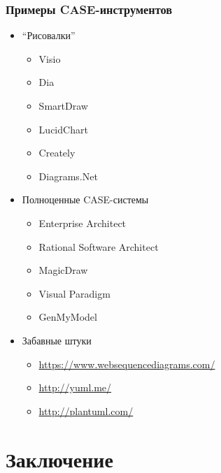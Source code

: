 \documentclass[xetex,mathserif,serif]{beamer}
\begin{document}
    \begin{frame}
        \frametitle{Примеры CASE-инструментов}
        \begin{itemize}
            \item ``Рисовалки''
            \begin{itemize}
                \item Visio
                \item Dia
                \item SmartDraw
                \item LucidChart
                \item Creately
                \item Diagrams.Net
            \end{itemize}
            \item Полноценные CASE-системы
            \begin{itemize}
                \item Enterprise Architect
                \item Rational Software Architect
                \item MagicDraw
                \item Visual Paradigm
                \item GenMyModel
            \end{itemize}
            \item Забавные штуки
            \begin{itemize}
                \item \url{https://www.websequencediagrams.com/}
                \item \url{http://yuml.me/}
                \item \url{http://plantuml.com/}
            \end{itemize}
        \end{itemize}
    \end{frame}

    \section{Заключение}
\end{document}
